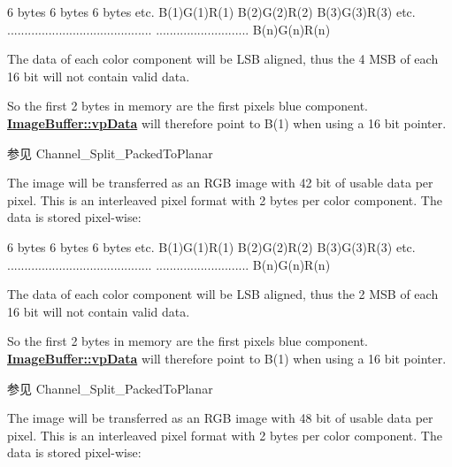 \begin{Desc}
\begin{description}
\begin{DoxyCode}
6 bytes        6 bytes        6 bytes      etc.
B(1)G(1)R(1)   B(2)G(2)R(2)   B(3)G(3)R(3) etc.
..........................................
...........................   B(n)G(n)R(n)
\end{DoxyCode}


The data of each color component will be L\+S\+B aligned, thus the 4 M\+S\+B of each 16 bit will not contain valid data.

So the first 2 bytes in memory are the first pixels blue component. {\bfseries \hyperlink{struct_image_buffer_ab67c9c21d749e786302c848b508e0673}{Image\+Buffer\+::vp\+Data}} will therefore point to B(1) when using a 16 bit pointer.

\begin{DoxySeeAlso}{参见}
Channel\+\_\+\+Split\+\_\+\+Packed\+To\+Planar 
\end{DoxySeeAlso}
\item[{\em 
\hypertarget{group___common_interface_gga456e8aa76e06bb761f27c52141475985a4fe5dfb018001e544c0099c13ce6ddec}{ibpf\+R\+G\+B141414\+Packed}\label{group___common_interface_gga456e8aa76e06bb761f27c52141475985a4fe5dfb018001e544c0099c13ce6ddec}
}]The image will be transferred as an R\+G\+B image with 42 bit of usable data per pixel. This is an interleaved pixel format with 2 bytes per color component. The data is stored pixel-\/wise\+:


\begin{DoxyCode}
6 bytes        6 bytes        6 bytes      etc.
B(1)G(1)R(1)   B(2)G(2)R(2)   B(3)G(3)R(3) etc.
..........................................
...........................   B(n)G(n)R(n)
\end{DoxyCode}


The data of each color component will be L\+S\+B aligned, thus the 2 M\+S\+B of each 16 bit will not contain valid data.

So the first 2 bytes in memory are the first pixels blue component. {\bfseries \hyperlink{struct_image_buffer_ab67c9c21d749e786302c848b508e0673}{Image\+Buffer\+::vp\+Data}} will therefore point to B(1) when using a 16 bit pointer.

\begin{DoxySeeAlso}{参见}
Channel\+\_\+\+Split\+\_\+\+Packed\+To\+Planar 
\end{DoxySeeAlso}
\item[{\em 
\hypertarget{group___common_interface_gga456e8aa76e06bb761f27c52141475985a7a5c25c3001d2daf2b4520f0667a7469}{ibpf\+R\+G\+B161616\+Packed}\label{group___common_interface_gga456e8aa76e06bb761f27c52141475985a7a5c25c3001d2daf2b4520f0667a7469}
}]The image will be transferred as an R\+G\+B image with 48 bit of usable data per pixel. This is an interleaved pixel format with 2 bytes per color component. The data is stored pixel-\/wise\+:



\end{description}
\end{Desc}
